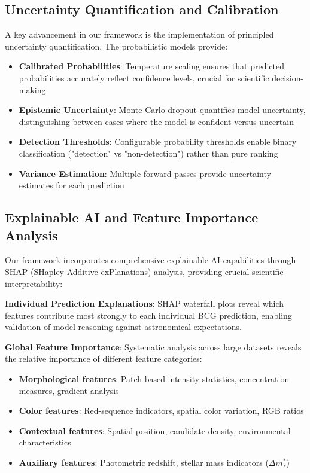 \documentclass[twocolumn,10pt]{aastex631}
\begin{document}
\subsection{Uncertainty Quantification and Calibration}

A key advancement in our framework is the implementation of principled uncertainty quantification. The probabilistic models provide:

\begin{itemize}
\item \textbf{Calibrated Probabilities}: Temperature scaling ensures that predicted probabilities accurately reflect confidence levels, crucial for scientific decision-making
\item \textbf{Epistemic Uncertainty}: Monte Carlo dropout quantifies model uncertainty, distinguishing between cases where the model is confident versus uncertain
\item \textbf{Detection Thresholds}: Configurable probability thresholds enable binary classification ("detection" vs "non-detection") rather than pure ranking
\item \textbf{Variance Estimation}: Multiple forward passes provide uncertainty estimates for each prediction
\end{itemize}

\subsection{Explainable AI and Feature Importance Analysis}

Our framework incorporates comprehensive explainable AI capabilities through SHAP (SHapley Additive exPlanations) analysis, providing crucial scientific interpretability:

\textbf{Individual Prediction Explanations}: SHAP waterfall plots reveal which features contribute most strongly to each individual BCG prediction, enabling validation of model reasoning against astronomical expectations.

\textbf{Global Feature Importance}: Systematic analysis across large datasets reveals the relative importance of different feature categories:
\begin{itemize}
\item \textbf{Morphological features}: Patch-based intensity statistics, concentration measures, gradient analysis
\item \textbf{Color features}: Red-sequence indicators, spatial color variation, RGB ratios
\item \textbf{Contextual features}: Spatial position, candidate density, environmental characteristics  
\item \textbf{Auxiliary features}: Photometric redshift, stellar mass indicators ($\Delta m^*_z$)
\end{itemize}
\end{document}

